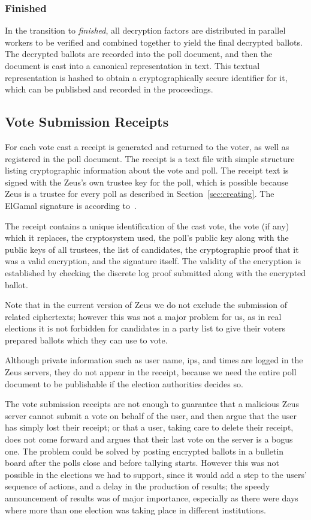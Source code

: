 \documentclass[letterpaper,10pt]{article}
\begin{document}
\subsubsection{Finished}
\label{sec:finished}
In the transition to \emph{finished}, all decryption factors are
distributed in parallel workers to be verified and combined together
to yield the final decrypted ballots.
The decrypted ballots are recorded into the poll document,
and then the document is cast into a canonical representation in text.
This textual representation is hashed to obtain a cryptographically
secure identifier for it, which can be published and recorded
in the proceedings.

\subsection{Vote Submission Receipts}
\label{sec:receipts}

For each vote cast a receipt is generated and returned to the voter,
as well as registered in the poll document.
The receipt is a text file with simple structure listing cryptographic
information about the vote and poll.
The receipt text is signed with the Zeus's own trustee key for the
poll, which is possible because Zeus is a trustee for every poll
as described in Section~\ref{sec:creating}.
The ElGamal signature is according to~\cite{schneier:1995}.

The receipt contains a unique identification of the cast vote,
the vote (if any) which it replaces, the cryptosystem used,
the poll's public key along with the public keys of all trustees,
the list of candidates, the cryptographic proof that it was a valid
encryption, and the signature itself. The validity of the encryption
is established by checking the discrete log proof submitted along with
the encrypted ballot. 

Note that in the current version of Zeus we do not exclude the
submission of related ciphertexts; however this was not a major
problem for us, as in real elections it is not forbidden for
candidates in a party list to give their voters prepared ballots
which they can use to vote.

Although private information such as user name, {\sc ip}s, and times
are logged in the Zeus servers, they do not appear in the receipt,
because we need the entire poll document to be publishable if
the election authorities decides so.

The vote submission receipts are not enough to guarantee that a
malicious Zeus server cannot submit a vote on behalf of the user, and
then argue that the user has simply lost their receipt; or that a
user, taking care to delete their receipt, does not come forward and
argues that their last vote on the server is a bogus one. The problem
could be solved by posting encrypted ballots in a bulletin board after the
polls close and before tallying starts. However this was not possible
in the elections we had to support, since it would add a step to the
users' sequence of actions, and a delay in the production of results;
the speedy announcement of results was of major importance, especially
as there were days where more than one election was taking place in
different institutions.
\end{document}

